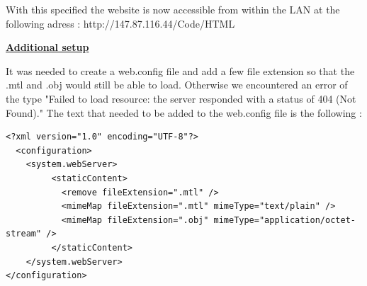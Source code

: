 \documentclass{scrartcl}
\begin{document}
With this specified the website is now accessible from within the LAN at the following adress : http://147.87.116.44/Code/HTML

\textbf{\underline{Additional setup}}

It was needed to create a web.config file and add a few file extension so that the .mtl and .obj would still be able to load. 
Otherwise we encountered an error of the type "Failed to load resource: the server responded with a status of 404 (Not Found)." 
The text that needed to be added to the web.config file is the following : \\
\lstset{language=XML}
\begin{lstlisting}
<?xml version="1.0" encoding="UTF-8"?>
  <configuration>
    <system.webServer>
         <staticContent>
           <remove fileExtension=".mtl" />
           <mimeMap fileExtension=".mtl" mimeType="text/plain" />
           <mimeMap fileExtension=".obj" mimeType="application/octet-stream" />
         </staticContent>
    </system.webServer>
</configuration>
\end{lstlisting}
\end{document}
